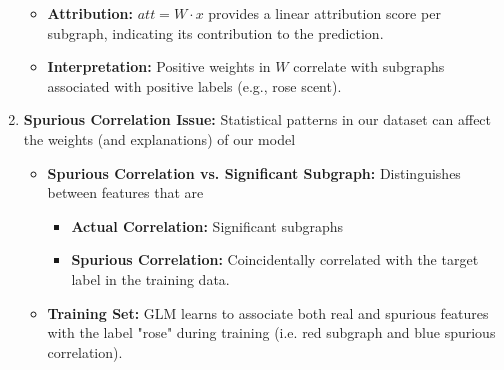 \begin{example}
\begin{enumerate}
\begin{itemize}
\begin{itemize}
            \end{itemize}
            \item \textbf{Attribution:} \( att = W \cdot x \) provides a linear attribution score per subgraph, indicating its contribution to the prediction.
            \item \textbf{Interpretation:} Positive weights in \( W \) correlate with subgraphs associated with positive labels (e.g., rose scent).
        \end{itemize}        
        \newpage
        \item \textbf{Spurious Correlation Issue:} Statistical patterns in our dataset can affect the weights (and explanations) of our model
        \begin{itemize}            
            \item \textbf{Spurious Correlation vs. Significant Subgraph:} Distinguishes between features that are 
            \begin{itemize}
                \item \textbf{Actual Correlation:} Significant subgraphs
                \item \textbf{Spurious Correlation:} Coincidentally correlated with the target label in the training data.
            \end{itemize}
        
            \item \textbf{Training Set:} GLM learns to associate both real and spurious features with the label "rose" during training (i.e. red subgraph and blue spurious correlation).
        

\end{itemize}
\end{enumerate}
\end{example}
